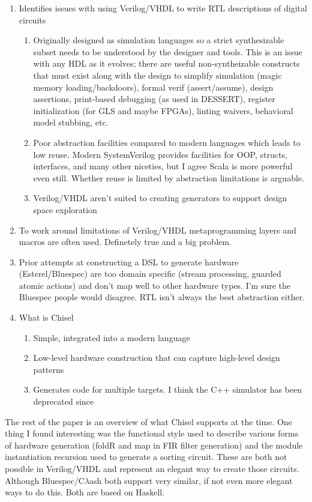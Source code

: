 \begin{enumerate}
\item Identifies issues with using Verilog/VHDL to write RTL descriptions of digital circuits
    \begin{enumerate}
        \item Originally designed as simulation languages so a strict synthesizable subset needs to be understood by the designer and tools. {\color{blue} This is an issue with any HDL as it evolves; there are useful non-syntheizable constructs that must exist along with the design to simplify simulation (magic memory loading/backdoors), formal verif (assert/assume), design assertions, print-based debugging (as used in DESSERT), register initialization (for GLS and maybe FPGAs), linting waivers, behavioral model stubbing, etc.}
        \item Poor abstraction facilities compared to modern languages which leads to low reuse. {\color{blue} Modern SystemVerilog provides facilities for OOP, structs, interfaces, and many other niceties, but I agree Scala is more powerful even still. Whether reuse is limited by abstraction limitations is arguable.}
        \item Verilog/VHDL aren't suited to creating generators to support design space exploration
    \end{enumerate}
\item To work around limitations of Verilog/VHDL metaprogramming layers and macros are often used. {\color{blue} Definetely true and a big problem.}
\item Prior attempts at constructing a DSL to generate hardware (Esterel/Bluespec) are too domain specific (stream processing, guarded atomic actions) and don't map well to other hardware types. {\color{blue} I'm sure the Bluespec people would disagree. RTL isn't always the best abstraction either.}
\item What is Chisel
    \begin{enumerate}
        \item Simple, integrated into a modern language
        \item Low-level hardware construction that can capture high-level design patterns
        \item Generates code for multiple targets. {\color{blue} I think the C++ simulator has been deprecated since}
    \end{enumerate}
\end{enumerate}

The rest of the paper is an overview of what Chisel supports at the time. One thing I found interesting was the functional style used to describe various forms of hardware generation (foldR and map in FIR filter generation) and the module instantiation recursion used to generate a sorting circuit. {\color{blue} These are both not possible in Verilog/VHDL and represent an elegant way to create those circuits. Although Bluespec/C$\lambda$ash both support very similar, if not even more elegant ways to do this. Both are based on Haskell.}

